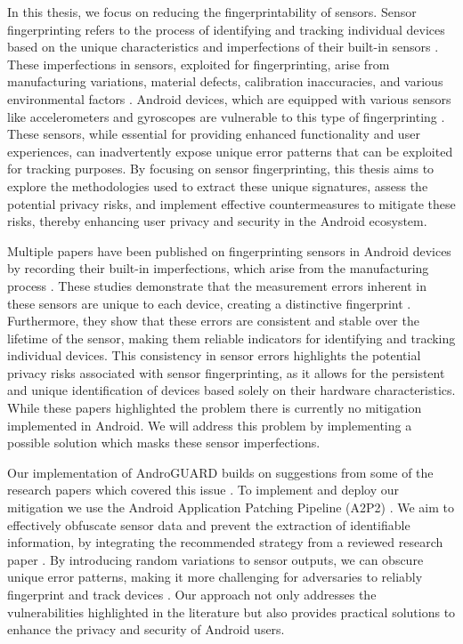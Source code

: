 \documentclass[11pt,
  oneside,openany,    %
]{scrreprt}
\begin{document}
In this thesis, we focus on reducing the fingerprintability of sensors.
Sensor fingerprinting refers to the process of identifying and tracking individual devices based on the unique characteristics and imperfections of their built-in sensors \cite{DBLP:conf/ndss/DeyRXCN14}. 
These imperfections in sensors, exploited for fingerprinting, arise from manufacturing variations, material defects, calibration inaccuracies, and various environmental factors \cite{DBLP:journals/comsur/BaldiniS17, DBLP:journals/popets/DasBC18, DBLP:journals/tifs/ZhangBS21}. 
Android devices, which are equipped with various sensors like accelerometers and gyroscopes are vulnerable to this type of fingerprinting \cite{DBLP:conf/ndss/DasBC16}. 
These sensors, while essential for providing enhanced functionality and user experiences, can inadvertently expose unique error patterns that can be exploited for tracking purposes. 
By focusing on sensor fingerprinting, this thesis aims to explore the methodologies used to extract these unique signatures, assess the potential privacy risks, and implement effective countermeasures to mitigate these risks, thereby enhancing user privacy and security in the Android ecosystem.

Multiple papers have been published on fingerprinting sensors in Android devices by recording their built-in imperfections, which arise from the manufacturing process \cite{DBLP:conf/ccs/DasBC14}. 
These studies demonstrate that the measurement errors inherent in these sensors are unique to each device, creating a distinctive fingerprint \cite{DBLP:conf/ccs/0001ABP18, DBLP:journals/tifs/AmeriniBCMN17}. 
Furthermore, they show that these errors are consistent and stable over the lifetime of the sensor, making them reliable indicators for identifying and tracking individual devices. 
This consistency in sensor errors highlights the potential privacy risks associated with sensor fingerprinting, as it allows for the persistent and unique identification of devices based solely on their hardware characteristics.
While these papers highlighted the problem there is currently no mitigation implemented in Android.
We will address this problem by implementing a possible solution which masks these sensor imperfections.

Our implementation of AndroGUARD builds on suggestions from some of the research papers which covered this issue \cite{DBLP:conf/ndss/DasBC16, DBLP:journals/tifs/AmeriniBCMN17, DBLP:conf/ccs/0001ABP18}. 
To implement and deploy our mitigation we use the Android Application Patching Pipeline (A2P2) \cite{DBLP:conf/IEEEares/Draschbacher23}.
We aim to effectively obfuscate sensor data and prevent the extraction of identifiable information, by integrating the recommended strategy from a reviewed research paper \cite{DBLP:conf/ndss/DasBC16}. 
By introducing random variations to sensor outputs, we can obscure unique error patterns, making it more challenging for adversaries to reliably fingerprint and track devices \cite{DBLP:journals/tifs/AmeriniBCMN17}. 
Our approach not only addresses the vulnerabilities highlighted in the literature but also provides practical solutions to enhance the privacy and security of Android users.
\end{document}
